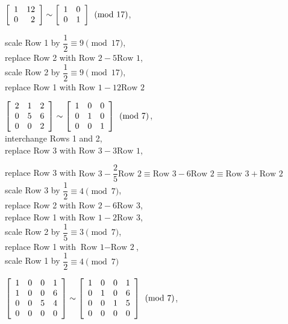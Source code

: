 \begin{enumerate}[!HW!, start=1]
\begin{multicols}{2}
\itemspade $\mtx{rr}{1&12\\0&2}\sim\mtx{rr}{1&0\\0&1} \pmod{17}$,\columnbreak 

scale Row 1 by $\dfrac{1}{2}\equiv 9 \pmod{17}$,\\ replace Row 2 with $\text{Row 2} - 5\text{Row 1}$,\\ scale Row 2 by $\dfrac{1}{2}\equiv 9 \pmod{17}$,\\ replace Row 1 with $\text{Row 1} - 12\text{Row 2}$
\end{multicols}

\begin{multicols}{2}
\itemspade $\mtx{rrr}{2&1&2\\0&5&6\\0&0&2}\sim\mtx{rrr}{1&0&0\\0&1&0\\0&0&1} \pmod 7$,\\ 

interchange Rows 1 and 2,\\ replace Row 3 with $\text{Row 3} - 3\text{Row 1}$,\columnbreak

replace Row 3 with $\text{Row 3} - \dfrac{2}{5}\text{Row 2} \equiv \text{Row 3} - 6\text{Row 2} \equiv \text{Row 3} + \text{Row 2}$\\ scale Row 3 by $\dfrac{1}{2}\equiv 4\pmod 7$,\\ replace Row 2 with $\text{Row 2} - 6\text{Row 3}$,\\ replace Row 1 with $\text{Row 1} - 2\text{Row 3}$,\\ scale Row 2 by $\dfrac{1}{5} \equiv 3\pmod 7$,\\ replace Row 1 with $\text{Row 1} - \text{Row 2}$,\\ scale Row 1 by $\dfrac{1}{2} \equiv 4\pmod 7$
\end{multicols}

\begin{multicols}{2}
\item \mbox{$\mtx{rrrr}{1&0&0&1\\1&0&0&6\\0&0&5&4\\0&0&0&0}\sim \mtx{rrrr}{1&0&0&1\\0&1&0&6\\0&0&1&5\\0&0&0&0} \pmod 7$,} \columnbreak


\end{multicols}
\end{enumerate}
